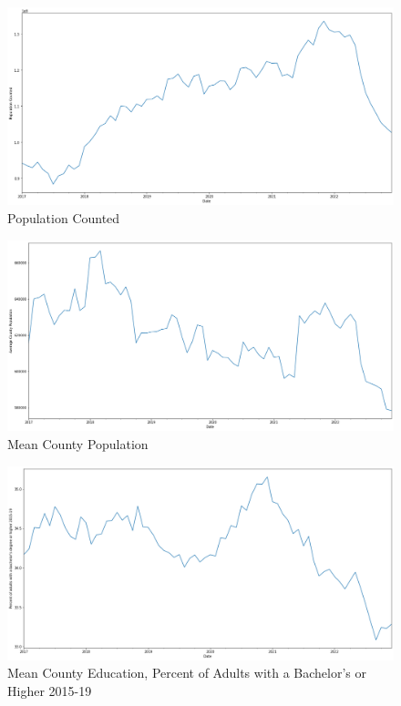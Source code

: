 \documentclass{article}
\begin{document}
\begin{figure}[!htb]
  \includegraphics[width=\linewidth]{population}
  \caption{Population Counted}
\end{figure}

\begin{figure}[!htb]
  \includegraphics[width=\linewidth]{mean county population}
  \caption{Mean County Population}
\end{figure}

\begin{figure}[!htb]
  \includegraphics[width=\linewidth]{mean county educ}
  \caption{Mean County Education, Percent of Adults with a Bachelor's or Higher 2015-19}
\end{figure}
\end{document}

